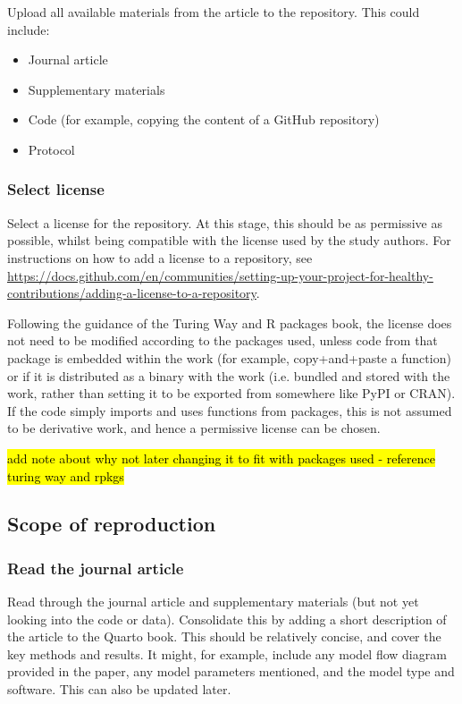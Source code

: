Upload all available materials from the article to the repository. This could include:
\begin{itemize}
    \item Journal article
    \item Supplementary materials
    \item Code (for example, copying the content of a GitHub repository)
    \item Protocol
\end{itemize}

\subsubsection{Select license}
\timeyes

Select a license for the repository. At this stage, this should be as permissive as possible, whilst being compatible with the license used by the study authors. For instructions on how to add a license to a repository, see \url{https://docs.github.com/en/communities/setting-up-your-project-for-healthy-contributions/adding-a-license-to-a-repository}.

Following the guidance of the Turing Way\autocite{the_turing_way_community_turing_2022} and R packages book,\autocite{wickham_12_2023} the license does not need to be modified according to the packages used, unless code from that package is embedded within the work (for example, copy+and+paste a function) or if it is distributed as a binary with the work (i.e. bundled and stored with the work, rather than setting it to be exported from somewhere like PyPI or CRAN). If the code simply imports and uses functions from packages, this is not assumed to be derivative work, and hence a permissive license can be chosen.

\hl{add note about why not later changing it to fit with packages used - reference turing way and rpkgs}

\subsection{Scope of reproduction}

\subsubsection{Read the journal article}
\timeyes

Read through the journal article and supplementary materials (but not yet looking into the code or data). Consolidate this by adding a short description of the article to the Quarto book. This should be relatively concise, and cover the key methods and results. It might, for example, include any model flow diagram provided in the paper, any model parameters mentioned, and the model type and software. This can also be updated later.

